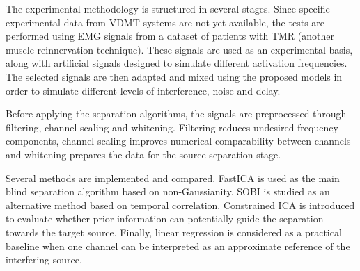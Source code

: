 The experimental methodology is structured in several stages. Since specific experimental data from VDMT systems are not yet available, the tests are performed using EMG signals from a dataset of patients with TMR (another muscle reinnervation technique). These signals are used as an experimental basis, along with artificial signals designed to simulate different activation frequencies. The selected signals are then adapted and mixed using the proposed models in order to simulate different levels of interference, noise and delay.

Before applying the separation algorithms, the signals are preprocessed through filtering, channel scaling and whitening. Filtering reduces undesired frequency components, channel scaling improves numerical comparability between channels and whitening prepares the data for the source separation stage.

Several methods are implemented and compared. FastICA is used as the main blind separation algorithm based on non-Gaussianity. SOBI is studied as an alternative method based on temporal correlation. Constrained ICA is introduced to evaluate whether prior information can potentially guide the separation towards the target source. Finally, linear regression is considered as a practical baseline when one channel can be interpreted as an approximate reference of the interfering source.

